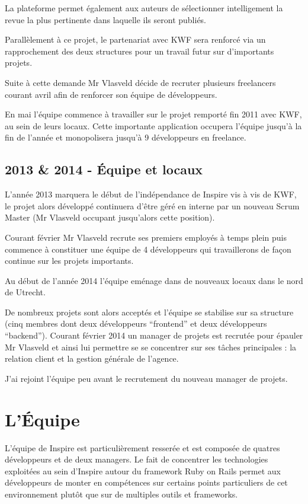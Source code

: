 \documentclass[12pt,a4paper]{book}
\begin{document}
La plateforme permet également aux auteurs de sélectionner intelligement la revue la plus pertinente dans laquelle ils seront publiés.

Parallèlement à ce projet, le partenariat avec KWF sera renforcé via un rapprochement des deux structures pour un travail futur sur d'importants projets.

Suite à cette demande Mr Vlasveld décide de recruter plusieurs freelancers courant avril afin de renforcer son équipe de développeurs.

En mai l'équipe commence à travailler sur le projet remporté fin 2011 avec KWF, au sein de leurs locaux. Cette importante application occupera l'équipe jusqu'à la fin de l'année et monopolisera jusqu'à 9 développeurs en freelance.

\subsection{2013 \& 2014 - Équipe et locaux}

L'année 2013 marquera le début de l'indépendance de Inspire vis à vis de KWF, le projet alors développé continuera d'être géré en interne par un nouveau Scrum Master (Mr Vlasveld occupant jusqu'alors cette position).

Courant février Mr Vlasveld recrute ses premiers employés à temps plein puis commence à constituer une équipe de 4 développeurs qui travaillerons de façon continue sur les projets importants.

Au début de l'année 2014 l'équipe eménage dans de nouveaux locaux dans le nord de Utrecht.

De nombreux projets sont alors acceptés et l'équipe se stabilise sur sa structure (cinq membres dont deux développeurs ``frontend'' et deux développeurs ``backend''). Courant février 2014 un manager de projets est recrutée pour épauler Mr Vlasveld et ainsi lui permettre se se concentrer sur ses tâches principales : la relation client et la gestion générale de l'agence.

J'ai rejoint l'équipe peu avant le recrutement du nouveau manager de projets.

\section{L'Équipe}

L'équipe de Inspire est particulièrement resserée et est composée de quatres développeurs et de deux managers. Le fait de concentrer les technologies exploitées au sein d'Inspire autour du framework Ruby on Rails permet aux développeurs de monter en compétences sur certains points particuliers de cet environnement plutôt que sur de multiples outils et frameworks.
\end{document}
